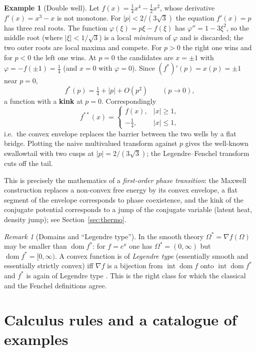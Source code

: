 \documentclass[11pt,a4paper]{article}
\DeclareMathOperator{\dom}{dom}
\theoremstyle{plain}
\theoremstyle{definition}
\newtheorem{example}[theorem]{Example}
\theoremstyle{remark}
\newtheorem{remark}[theorem]{Remark}
\begin{document}
\begin{example}[Double well]\label{ex:doublewell}
Let $f(x)=\tfrac14x^4-\tfrac12x^2$, whose derivative $f'(x)=x^3-x$ is not
monotone.  For $|p|<2/(3\sqrt3)$ the equation $f'(x)=p$ has three real roots.
The function $\varphi(\xi)=p\xi-f(\xi)$ has $\varphi''=1-3\xi^2$, so the
middle root (where $|\xi|<1/\sqrt3$) is a local \emph{minimum} of $\varphi$
and is discarded; the two outer roots are local maxima and compete.  For
$p>0$ the right one wins and for $p<0$ the left one wins.  At $p=0$ the
candidates are $x=\pm1$ with $\varphi=-f(\pm1)=\tfrac14$ (and $x=0$ with
$\varphi=0$).  Since $(f^*)'(p)=x(p)=\pm1$ near $p=0$,
\[
  f^*(p)=\tfrac14+|p|+O(p^2)\qquad(p\to0),
\]
a function with a \textbf{kink} at $p=0$.  Correspondingly
\[
  f^{**}(x)=\begin{cases}
  f(x), & |x|\ge1,\\[2pt] -\tfrac14, & |x|\le1,
  \end{cases}
\]
i.e.\ the convex envelope replaces the barrier between the two wells by a
flat bridge.  Plotting the naive multivalued transform against $p$ gives the
well-known swallowtail with two cusps at $|p|=2/(3\sqrt3)$; the
Legendre--Fenchel transform cuts off the tail.
\end{example}

This is precisely the mathematics of a \emph{first-order phase transition}:
the Maxwell construction replaces a non-convex free energy by its convex
envelope, a flat segment of the envelope corresponds to phase coexistence, and
the kink of the conjugate potential corresponds to a jump of the conjugate
variable (latent heat, density jump); see Section~\ref{sec:thermo}.

\begin{remark}[Domains and ``Legendre type'']
In the smooth theory $\Omega^*=\nabla f(\Omega)$ may be smaller than
$\dom f^*$: for $f=e^x$ one has $\Omega^*=(0,\infty)$ but
$\dom f^*=[0,\infty)$.  A convex function is of \emph{Legendre type}
(essentially smooth and essentially strictly convex) iff $\nabla f$ is a
bijection from $\operatorname{int}\dom f$ onto $\operatorname{int}\dom f^*$
and $f^*$ is again of Legendre type \cite[Thm.~26.5]{Rockafellar}.
This is the right class for which the classical and the Fenchel definitions
agree.
\end{remark}

\section{Calculus rules and a catalogue of examples}\label{sec:examples}
\end{document}
